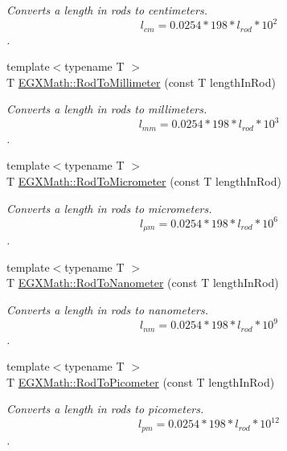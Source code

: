 \begin{DoxyCompactItemize}
\begin{DoxyCompactList}\small\item\em Converts a length in rods to centimeters. \[ l_{cm}=0.0254 * 198 * l_{rod} * 10^{2} \]. \end{DoxyCompactList}\item 
{\footnotesize template$<$typename T $>$ }\\T \mbox{\hyperlink{group___e_g_x_math-_conversions-_length_conversions-_imperial-_rod-_s_i_gac99fbcf597375add3d57bcf16d64a890}{E\+G\+X\+Math\+::\+Rod\+To\+Millimeter}} (const T length\+In\+Rod)
\begin{DoxyCompactList}\small\item\em Converts a length in rods to millimeters. \[ l_{mm}=0.0254 * 198 * l_{rod} * 10^{3} \]. \end{DoxyCompactList}\item 
{\footnotesize template$<$typename T $>$ }\\T \mbox{\hyperlink{group___e_g_x_math-_conversions-_length_conversions-_imperial-_rod-_s_i_ga8821e67ddd408e4b4b9c4d1512b6a9d8}{E\+G\+X\+Math\+::\+Rod\+To\+Micrometer}} (const T length\+In\+Rod)
\begin{DoxyCompactList}\small\item\em Converts a length in rods to micrometers. \[ l_{\mu m}=0.0254 * 198 * l_{rod} * 10^{6} \]. \end{DoxyCompactList}\item 
{\footnotesize template$<$typename T $>$ }\\T \mbox{\hyperlink{group___e_g_x_math-_conversions-_length_conversions-_imperial-_rod-_s_i_gaa41557dd8cc5aa5ff83312665e8a4331}{E\+G\+X\+Math\+::\+Rod\+To\+Nanometer}} (const T length\+In\+Rod)
\begin{DoxyCompactList}\small\item\em Converts a length in rods to nanometers. \[ l_{nm}=0.0254 * 198 * l_{rod} * 10^{9} \]. \end{DoxyCompactList}\item 
{\footnotesize template$<$typename T $>$ }\\T \mbox{\hyperlink{group___e_g_x_math-_conversions-_length_conversions-_imperial-_rod-_s_i_ga212e66c6922a0df85714ec8559af8790}{E\+G\+X\+Math\+::\+Rod\+To\+Picometer}} (const T length\+In\+Rod)
\begin{DoxyCompactList}\small\item\em Converts a length in rods to picometers. \[ l_{pm}=0.0254 * 198 * l_{rod} * 10^{12} \]. \end{DoxyCompactList}\item 

\end{DoxyCompactItemize}
